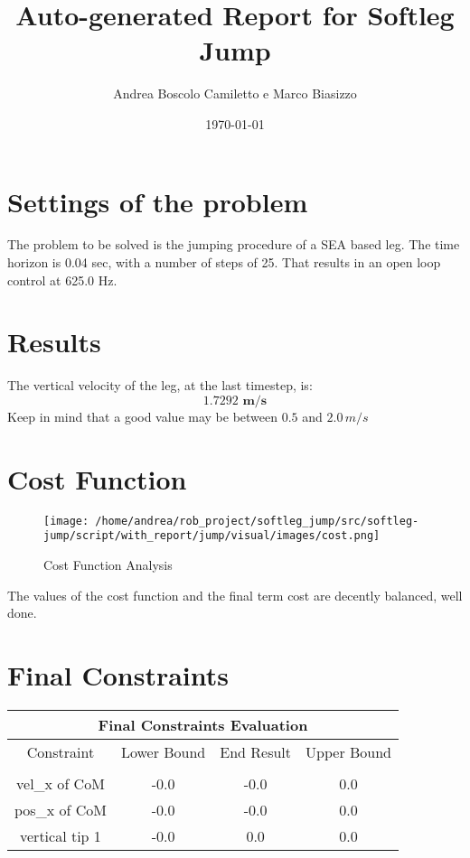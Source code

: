 \documentclass{article}%
\title{Auto{-}generated Report for Softleg Jump}%
\author{Andrea Boscolo Camiletto e Marco Biasizzo}%
\date{\today}%
\begin{document}
%
\normalsize%
\maketitle%
\section{Settings of the problem}%
\label{sec:Settingsoftheproblem}%
The problem to be solved is the jumping procedure of a SEA based leg.%
The time horizon is 0.04 sec, with a number of steps of 25. That results in an open loop control at 625.0 Hz.

%
\section{Results}%
\label{sec:Results}%
The vertical velocity of the leg, at the last timestep, is:%
\[%
\boldsymbol{1.7292\,\, m/s}%
\]%
Keep in mind that a good value may be between $0.5$ and $2.0 \, m/s$

%
\section{Cost Function}%
\label{sec:CostFunction}%


\begin{figure}[h!]%
\centering%
\texttt{[image: /home/andrea/rob\_project/softleg\_jump/src/softleg-jump/script/with\_report/jump/visual/images/cost.png]}%
\caption{Cost Function Analysis}%
\end{figure}

%
%
The values of the cost function and the final term cost are decently balanced, well done.

%
\pagebreak%
\section{Final Constraints}%
\label{sec:FinalConstraints}%
\begin{center}%
\begin{tabular}{c|c|c|c}%
\hline%
\multicolumn{4}{|c|}{Final Constraints Evaluation}\\%
\hline%
Constraint&Lower Bound&End Result&Upper Bound\\%
\hline%
&&&\\%
\multirow{1}{*}{vel\_x of CoM}&{-}0.0&{-}0.0&0.0\\%
\hline%
\multirow{1}{*}{pos\_x of CoM}&{-}0.0&{-}0.0&0.0\\%
\hline%
\multirow{1}{*}{vertical tip 1}&{-}0.0&0.0&0.0\\%
\hline%
\end{tabular}%
\end{center}
\end{document}
